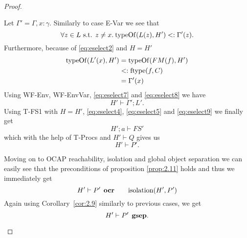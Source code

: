\begin{proof}
\begin{description}
\begin{description}
\begin{description}
\begin{equation}
              \end{equation}
              Let $\Gamma' = \Gamma, x: \gamma$. Similarly to case {\sc E-Var}
              we see that
              \begin{equation} \label{eq:eselect7}
                \forall z \in L \text{ s.t. } z \neq x . \: \mbox{$\mathrm{typeOf}$}(L(z), H')
                <: \Gamma'(z).
              \end{equation}
              Furthermore, because of \eqref{eq:eselect2} and $H = H'$
              \begin{equation} \label{eq:eselect8}
                \begin{aligned}
                  \mbox{$\mathrm{typeOf}$}(L'(x), H') &= \mbox{$\mathrm{typeOf}$}(FM(f), H') \\
                                     &<: \mbox{$\mathrm{ftype}$}(f, C) \\
                                     &= \Gamma'(x)
                \end{aligned}
              \end{equation}
              Using {\sc WF-Env, WF-EnvVar}, \eqref{eq:eselect7} and
              \eqref{eq:eselect8} we have
              \begin{equation} \label{eq:eselect9}
                H' \vdash \Gamma';L'.
              \end{equation}
              Using {\sc T-FS1} with $H = H'$, \eqref{eq:eselect4}, \eqref{eq:eselect5}
              and \eqref{eq:eselect9} we finally get
              \begin{equation}
                H';a \vdash FS'
              \end{equation}
              which with the help of {\sc T-Procs} and $H' \vdash Q$ gives us 
              \begin{equation*}
                H'\vdash P'.
              \end{equation*}
              
              Moving on to OCAP reachability, isolation and global object
              separation we can easily see that the preconditions of proposition
              \ref{prop:2.11} holds and thus we immediately get
              \begin{equation*}
                H' \vdash P' \:\: \mbox{\bf ocr} \quad\quad \mbox{$\mathrm{isolation}$}(H', P')
              \end{equation*}
              Again using Corollary~\ref{cor:2.9} similarly to previous cases, we get
              \begin{equation*}
                H' \vdash P' \:\: \mbox{\bf gsep}.
              \end{equation*}



\end{description}
\end{description}
\end{description}
\end{proof}
